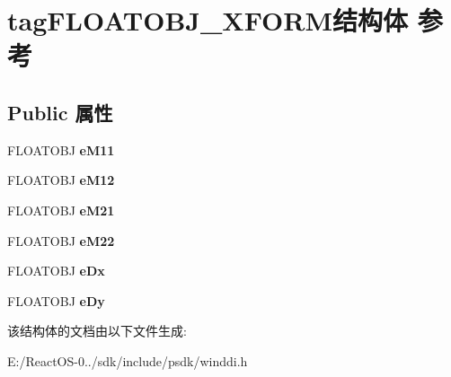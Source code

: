 \hypertarget{structtag_f_l_o_a_t_o_b_j___x_f_o_r_m}{}\section{tag\+F\+L\+O\+A\+T\+O\+B\+J\+\_\+\+X\+F\+O\+R\+M结构体 参考}
\label{structtag_f_l_o_a_t_o_b_j___x_f_o_r_m}
\subsection*{Public 属性}
\begin{DoxyCompactItemize}
\item 
\mbox{\label{structtag_f_l_o_a_t_o_b_j___x_f_o_r_m_a011ceafd1922cd68fd1b70054b674c8d}} 
F\+L\+O\+A\+T\+O\+BJ {\bfseries e\+M11}
\item 
\mbox{\label{structtag_f_l_o_a_t_o_b_j___x_f_o_r_m_abd7cf9d6b2ed39de19bf3696c3fed494}} 
F\+L\+O\+A\+T\+O\+BJ {\bfseries e\+M12}
\item 
\mbox{\label{structtag_f_l_o_a_t_o_b_j___x_f_o_r_m_a8712887bf22ce620171992904d7719f2}} 
F\+L\+O\+A\+T\+O\+BJ {\bfseries e\+M21}
\item 
\mbox{\label{structtag_f_l_o_a_t_o_b_j___x_f_o_r_m_a1a81cf327d9bdab4b478b9034982f966}} 
F\+L\+O\+A\+T\+O\+BJ {\bfseries e\+M22}
\item 
\mbox{\label{structtag_f_l_o_a_t_o_b_j___x_f_o_r_m_a7e0d36963180347dbc7161e6f7c13c23}} 
F\+L\+O\+A\+T\+O\+BJ {\bfseries e\+Dx}
\item 
\mbox{\label{structtag_f_l_o_a_t_o_b_j___x_f_o_r_m_abfce527d56186774eb3636fea65cce72}} 
F\+L\+O\+A\+T\+O\+BJ {\bfseries e\+Dy}
\end{DoxyCompactItemize}


该结构体的文档由以下文件生成\+:\begin{DoxyCompactItemize}
\item 
E\+:/\+React\+O\+S-\/0../sdk/include/psdk/winddi.\+h\end{DoxyCompactItemize}
